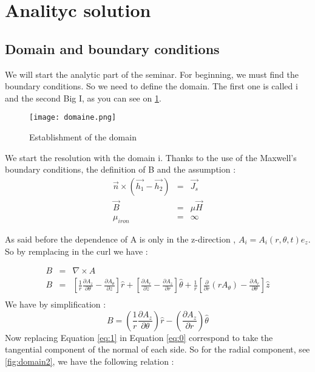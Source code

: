 \section{Analityc solution}
\subsection{Domain and boundary conditions}
We will start the analytic part of the seminar. For beginning, we must find the boundary conditions. So we need to define the domain. 
The first one is called i and the second Big I, as you can see on \ref{fig:domaine}.

\begin{figure}[H]
    \centering
    \texttt{[image: domaine.png]}
    \caption{Establishment of the domain}   
    \label{fig:domaine}
\end{figure}

We start the resolution with the domain i. Thanks to the use of the Maxwell's boundary conditions, the definition of B and the assumption :
\begin{eqnarray}\label{eq:0}
    \vec{n} \times (\vec{h_1}-\vec{h_2}) &=& \vec{J_s} \\
    \vec{B} &=& \mu \vec{H}\\
    \mu_{iron} &=& \infty
\end{eqnarray}

As said before the dependence of A is only in the z-direction , $A_i = A_i(r,\theta,t)e_z$. So by remplacing in the curl we have :

\begin{eqnarray}
    B &=& \nabla \times A\\
    B &=& \left[ \frac{1}{r} \frac{\partial A_z}{\partial \theta} - \frac{\partial A_\theta}{\partial z}\right]\hat{r}+ \left[ \frac{\partial A_r}{\partial z} - \frac{\partial A_z}{\partial r}\right]\hat{\theta}+\frac{1}{r} \left[ \frac{\partial}{\partial r}(rA_\theta ) - \frac{\partial A_r}{\partial \theta}\right]\hat{z}\\
\end{eqnarray}
    We have by simplification : 
\begin{equation}\label{eq:1}
    B = \left(\frac{1}{r} \frac{\partial A_z}{\partial \theta}\right)\hat{r}-\left(\frac{\partial A_z}{\partial r}\right)\hat{\theta}
\end{equation}
Now replacing Equation \ref{eq:1} in Equation \ref{eq:0} correspond to take the tangential component of the normal of each side. So for the radial component, see \ref{fig:domain2}, we have the following relation :

